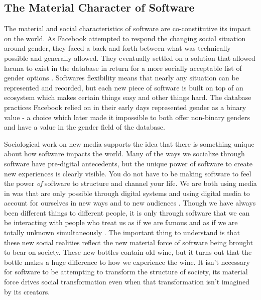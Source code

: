 \documentclass[a4paper,man,natbib,floatsintext]{apa6}
\begin{document}
  \subsection{The Material Character of Software}
  The material and social characteristics of software are co-constitutive its impact on the world. As Facebook attempted to respond the changing social situation around gender, they faced a back-and-forth between what was technically possible and generally allowed. They eventually settled on a solution that allowed lacuna to exist in the database in return for a more socially acceptable list of gender options \citep{Bivens2017-tc}. Softwares flexibility means that nearly any situation can be represented and recorded, but each new piece of software is built on top of an ecosystem which makes certain things easy and other things hard. The database practices Facebook relied on in their early days represented gender as a binary value - a choice which later made it impossible to both offer non-binary genders and have a value in the gender field of the database.

  Sociological work on new media supports the idea that there is something unique about how software impacts the world. Many of the ways we socialize through software have pre-digital antecedents, but the unique power of software to create new experiences is clearly visible. You do not have to be making software to feel the power \textit{of} software to structure and channel your life. We are both using media in was that are only possible through digital systems and using digital media to account for ourselves in new ways and to new audiences \citep{Humphreys2018-ge,Jurgenson2019-tl}. Though we have always been different things to different people, it is only through software that we can be interacting with people who treat us as if we are famous and as if we are totally unknown simultaneously \citep{Dean2010-lk}. The important thing to understand is that these new social realities reflect the new material force of software being brought to bear on society. These new bottles contain old wine, but it turns out that the bottle makes a huge difference to how we experience the wine. It isn't necessary for software to be attempting to transform the structure of society, its material force drives social transformation even when that transformation isn't imagined by its creators. 
\end{document}
